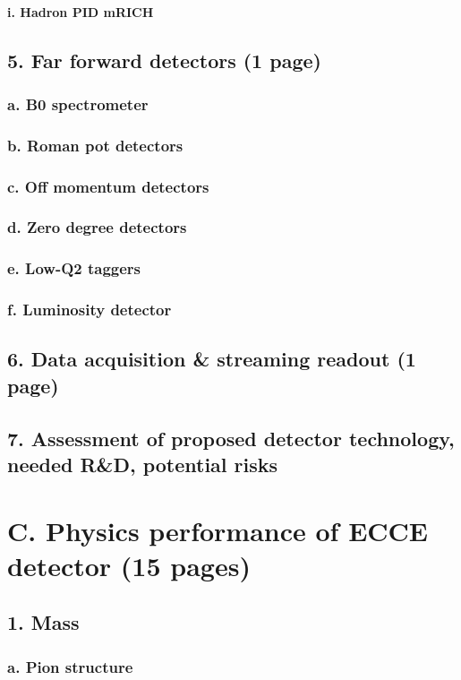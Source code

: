 \documentclass{report}
\begin{document}
\paragraph{i. Hadron PID mRICH}
\newpage
\subsection{5. Far forward detectors (1 page)}
\subsubsection{a. B0 spectrometer}
\subsubsection{b. Roman pot detectors}
\subsubsection{c. Off momentum detectors}
\subsubsection{d. Zero degree detectors}
\subsubsection{e. Low-Q2 taggers}
\subsubsection{f. Luminosity detector}
\subsection{6. Data acquisition \& streaming readout (1 page)}
\subsection{7. Assessment of proposed detector technology, needed R\&D, potential risks}
%
\section{C. Physics performance of ECCE detector (15 pages)}
\subsection{1. Mass}
\subsubsection{a. Pion structure}
\end{document}
